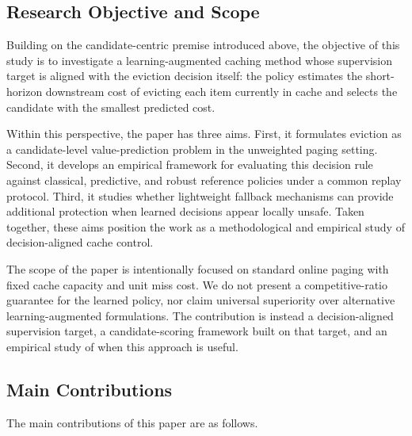 \documentclass[preprint,12pt]{elsarticle}
\begin{document}
\subsection{Research Objective and Scope}
\label{subsec:objective_scope}

Building on the candidate-centric premise introduced above, the objective of this study is to investigate a learning-augmented caching method whose supervision target is aligned with the eviction decision itself: the policy estimates the short-horizon downstream cost of evicting each item currently in cache and selects the candidate with the smallest predicted cost.

Within this perspective, the paper has three aims. First, it formulates eviction as a candidate-level value-prediction problem in the unweighted paging setting. Second, it develops an empirical framework for evaluating this decision rule against classical, predictive, and robust reference policies under a common replay protocol. Third, it studies whether lightweight fallback mechanisms can provide additional protection when learned decisions appear locally unsafe. Taken together, these aims position the work as a methodological and empirical study of decision-aligned cache control.

The scope of the paper is intentionally focused on standard online paging with fixed cache capacity and unit miss cost. We do not present a competitive-ratio guarantee for the learned policy, nor claim universal superiority over alternative learning-augmented formulations. The contribution is instead a decision-aligned supervision target, a candidate-scoring framework built on that target, and an empirical study of when this approach is useful.
\subsection{Main Contributions}
\label{subsec:main_contributions}

The main contributions of this paper are as follows.
\end{document}
